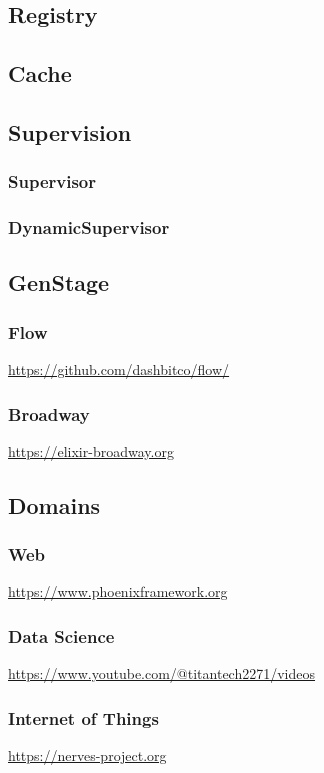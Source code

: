 {\subsection{Registry}

\subsection{Cache}

\subsection{Supervision}
\subsubsection{Supervisor}
\subsubsection{DynamicSupervisor}

\subsection{GenStage}
\subsubsection{Flow}

\url{https://github.com/dashbitco/flow/}

\subsubsection{Broadway}

\url{https://elixir-broadway.org}

\subsection{Domains}

\subsubsection{Web}

\url{https://www.phoenixframework.org}



\subsubsection{Data Science}

\url{https://www.youtube.com/@titantech2271/videos}

\subsubsection{Internet of Things}

\url{https://nerves-project.org}

}
